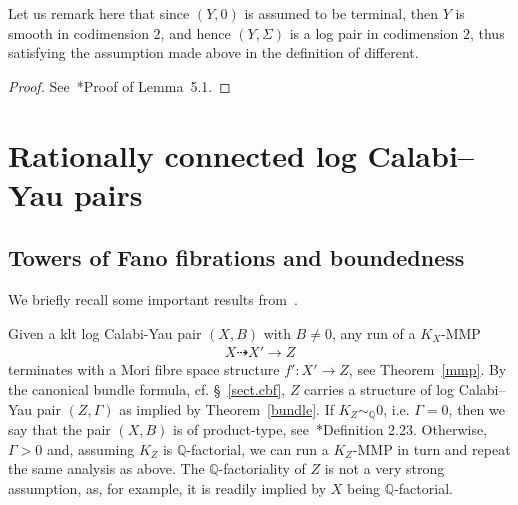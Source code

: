 \documentclass[11pt]{ip-journal}
\theoremstyle{definition}
\begin{document}
Let us remark here that since 
$(Y, 0)$ 
is assumed to be terminal, 
then 
$Y$ 
is smooth in codimension 
$2$, 
and hence 
$(Y, \Sigma)$ 
is a log pair in codimension 
$2$, 
thus satisfying the assumption made above in the definition of different.

\begin{proof}
See~\cite{DCS}*{Proof of Lemma~5.1}.
\end{proof}

\section{Rationally connected log Calabi--Yau pairs}
\label{rc.lcy.sect}
\subsection{Towers of Fano fibrations and boundedness} \label{towers.sect}
We briefly recall some important results from~\cites{1811.10709, DCS}.

Given a klt log Calabi-Yau pair $(X, B)$ with $B \neq 0$, any run of a $K_X$-MMP 
\begin{align*}
X \dashrightarrow X' \to Z
\end{align*}
terminates with a Mori fibre space structure $f' \colon X' \to Z$, see Theorem~\ref{mmp}.
By the canonical bundle formula, cf. \S~\ref{sect.cbf}, $Z$ carries a structure of log Calabi--Yau pair $(Z, \Gamma)$ as implied by Theorem~\ref{bundle}.
If $K_Z \sim_{\mathbb{Q}} 0$, i.e. $\Gamma=0$, then we say that the pair $(X, B)$ is of product-type, see~\cite{DCS}*{Definition 2.23}. 
Otherwise, $\Gamma > 0$ and, assuming $K_Z$ is $\mathbb{Q}$-factorial, we can run a $K_Z$-MMP in turn and repeat the same analysis as above.
The $\mathbb{Q}$-factoriality of $Z$ is not a very strong assumption, as, for example, it is readily implied by $X$ being $\mathbb{Q}$-factorial.
\end{document}
